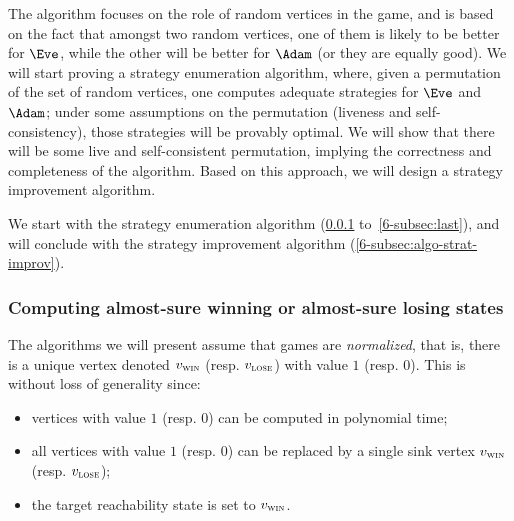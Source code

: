 The algorithm focuses on the role of random vertices in the game, and
is based on the fact that amongst two random vertices, one of them is
likely to be better for $\Eve$, while the other will be better for $\Adam$
(or they are equally good). We will start proving a strategy
enumeration algorithm, where, given a permutation of the set of random
vertices, one computes adequate strategies for $\Eve$ and $\Adam$; under
some assumptions on the permutation (liveness and self-consistency),
those strategies will be provably optimal. We will show that there
will be some live and self-consistent permutation, implying the
correctness and completeness of the algorithm. Based on this approach,
we will design a strategy improvement algorithm.

We start with the strategy enumeration algorithm
(\cref{6-subsec:first} to~\cref{6-subsec:last}), and will
conclude with the strategy improvement algorithm
(\cref{6-subsec:algo-strat-improv}).

\subsubsection{Computing almost-sure winning or almost-sure losing states}
\label{6-subsec:first}

The algorithms we will present assume that games are
\emph{normalized}, that is, there is a unique vertex denoted $v_{\textsc{win}}$
(resp. $v_{\textsc{lose}}$) with value $1$ (resp. $0$).  This is without loss of
generality since:
\begin{itemize}
\item vertices with value $1$ (resp. $0$) can be computed in
polynomial time;
\item all vertices with value $1$ (resp. $0$) can be replaced by a
single sink vertex $v_{\textsc{win}}$ (resp. $v_{\textsc{lose}}$);
\item the target reachability state is set to $v_{\textsc{win}}$.
\end{itemize}

